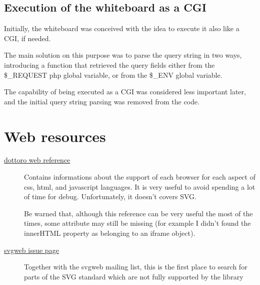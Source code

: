 \documentclass[10pt,a4paper,english]{book}
\begin{document}
\section{Execution of the whiteboard as a CGI}
\label{execution-of-the-whiteboard-as-a-cgi}

Initially, the whiteboard was conceived with the idea to execute it
also like a CGI, if needed.

The main solution on this purpose was to parse the query string in two
ways, introducing a function that retrieved the query fields either
from the {\$}{\_}REQUEST php global variable, or from the {\$}{\_}ENV global
variable.

The capability of being executed as a CGI was considered less
important later, and the initial query string parsing was removed from
the code.



\hypertarget{web-resources}{}
\chapter{Web resources}
\label{web-resources}
\begin{description}
\item[{\href{http://help.dottoro.com/index.php}{dottoro web reference}}] \leavevmode 
Contains informations about the support of each browser for each
aspect of css, html, and javascript languages. It is very useful
to avoid spending a lot of time for debug. Unfortunately, it
doesn't covers SVG.

Be warned that, although this reference can be very useful the
most of the times, some attribute may still be missing (for
example I didn't found the innerHTML property as belonging to an
iframe object).

\item[{\href{http://code.google.com/p/svgweb/issues/}{svgweb issue page}}] \leavevmode 
Together with the svgweb mailing list, this is the first place to
search for parts of the SVG standard which are not fully supported
by the library

\end{description}



\hypertarget{notes}{}
\end{document}
